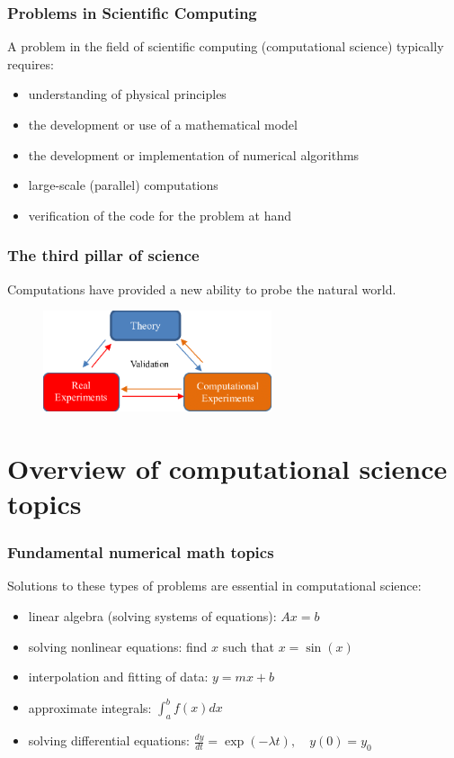 \documentclass{if-beamer}
\begin{document}
\begin{frame}
\frametitle{Problems in Scientific Computing}
A problem in the field of scientific computing (computational science) typically requires: \\[0.2cm]
\begin{itemize}
	\item understanding of physical principles
	\item the development or use of a mathematical model
	\item the development or implementation of numerical algorithms
	\item large-scale (parallel) computations
	\item verification of the code for the problem at hand
\end{itemize}
\end{frame}

\begin{frame}
\frametitle{The third pillar of science}
Computations have provided a new ability to probe the natural world.
\begin{figure}
	\center
	\includegraphics[width=0.6\textwidth]{threepillars.png}
\end{figure}
\end{frame}

\section{Overview of computational science topics}

\begin{frame}
\frametitle{Fundamental numerical math topics}
Solutions to these types of problems are essential in computational science:
\begin{itemize}
	\item linear algebra (solving systems of equations): $Ax=b$
	\item solving nonlinear equations: find $x$ such that $x = \sin({x})$
	\item interpolation and fitting of data: $y = mx + b$
	\item approximate integrals: $\int_{a}^{b} f(x) dx$
	\item solving differential equations: $\frac{dy}{dt} =
	\exp{(-\lambda t)}, \quad y(0) = y_{0}$
\end{itemize}
\end{frame}
\end{document}
